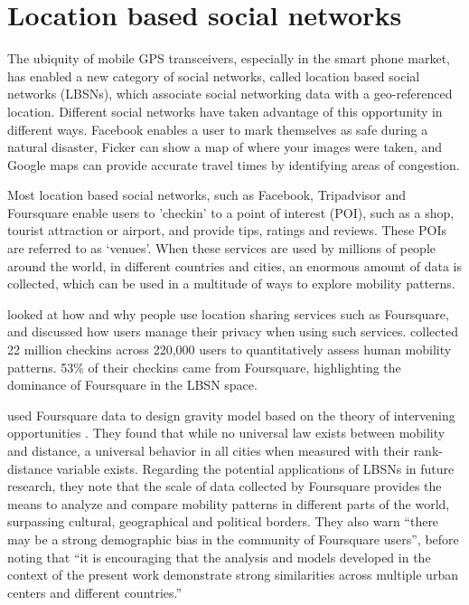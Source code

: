 \section{Location based social networks}
The ubiquity of mobile GPS transceivers, especially in the smart phone market, has enabled a new category of social networks, called location based social networks (LBSNs), which associate social networking data with a geo-referenced location. Different social networks have taken advantage of this opportunity in different ways. Facebook enables a user to mark themselves as safe during a natural disaster, Ficker can show a map of where your images were taken, and Google maps can provide accurate travel times by identifying areas of congestion. 

Most location based social networks, such as Facebook, Tripadvisor and Foursquare enable users to 'checkin' to a point of interest (POI), such as a shop, tourist attraction or airport, and provide tips, ratings and reviews. These POIs are referred to as `venues'. When these services are used by millions of people around the world, in different countries and cities, an enormous amount of data is collected, which can be used in a multitude of ways to explore mobility patterns. 

\textcite{lindqvist2011m} looked at how and why people use location sharing services such as Foursquare, and discussed how users manage their privacy when using such services. \autocite{cheng2011exploring} collected 22 million checkins across 220,000 users to quantitatively assess human mobility patterns. 53\% of their checkins came from Foursquare, highlighting the dominance of Foursquare in the LBSN space.

\textcite{noulas2012tale} used Foursquare data to design gravity model based on the theory of intervening opportunities \parencite{stouffer1940intervening}. They found that while no universal law exists between mobility and distance, a universal behavior in all cities when measured with their rank-distance variable exists. Regarding the potential applications of LBSNs in future research, they note that the scale of data collected by Foursquare provides the means to analyze and compare mobility patterns in different parts of the world, surpassing cultural, geographical and political borders. They also warn \enquote{there may be a strong demographic bias in the community of Foursquare users}, before noting that \enquote{it is encouraging that the analysis and models developed in the context of the present work demonstrate strong similarities across multiple urban centers and different countries.}

